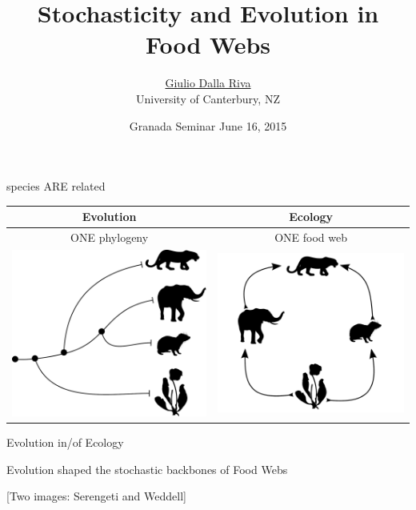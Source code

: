 \documentclass[ignorenonframetext,]{beamer}
\title{Stochasticity and Evolution in Food Webs}
\author{\href{http://gvdr.github.io}{Giulio Dalla Riva}\\ University of
Canterbury, NZ}
\date{Granada Seminar June 16, 2015}
\begin{document}
\frame{\titlepage}

\begin{frame}{species ARE related}

\begin{centering}
\begin{tabular}{|c|c|}\hline
Evolution & Ecology \\\hline\hline
ONE phylogeny & ONE food web \\
\includegraphics[width=0.5 \textwidth]{images/small_phylo.pdf} & \includegraphics[width=0.5 \textwidth]{images/small_fw.pdf} \\ \hline
\end{tabular}
\end{centering}

\end{frame}

\begin{frame}{Evolution in/of Ecology}

Evolution shaped the stochastic backbones of Food Webs

{[}Two images: Serengeti and Weddell{]}

\end{frame}
\end{document}
